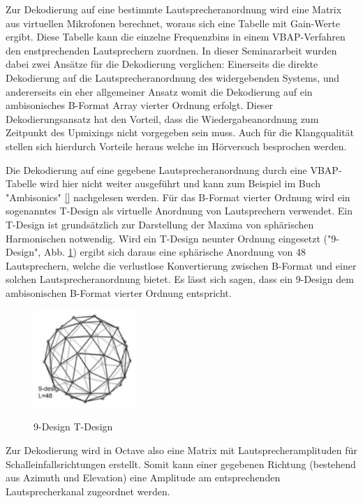 Zur Dekodierung auf eine bestimmte Lautsprecheranordnung wird eine Matrix aus virtuellen Mikrofonen berechnet, woraus sich eine Tabelle mit Gain-Werte ergibt. Diese Tabelle kann die einzelne Frequenzbins in einem VBAP-Verfahren den enstprechenden Lautsprechern zuordnen. In dieser Seminararbeit wurden dabei zwei Ansätze für die Dekodierung verglichen: Einerseits die direkte Dekodierung auf die Lautsprecheranordnung des widergebenden Systems, und andererseits ein eher allgemeiner Ansatz womit die Dekodierung auf ein ambisonisches B-Format Array vierter Ordnung erfolgt. Dieser Dekodierungsansatz hat den Vorteil, dass die Wiedergabeanordnung zum Zeitpunkt des Upmixings nicht vorgegeben sein muss. Auch für die Klangqualität stellen sich hierdurch Vorteile heraus welche im Hörversuch besprochen werden.

Die Dekodierung auf eine gegebene Lautsprecheranordnung durch eine VBAP-Tabelle wird hier nicht weiter ausgeführt und kann zum Beispiel im Buch "Ambisonics" \ref{} nachgelesen werden. Für das B-Format vierter Ordnung wird ein sogenanntes T-Design als virtuelle Anordnung von Lautsprechern verwendet. Ein T-Design ist grundsätzlich zur Darstellung der Maxima von sphärischen Harmonischen notwendig. Wird ein T-Design neunter Ordnung eingesetzt ("9-Design", Abb. \ref{fig:tdesign}) ergibt sich daraus eine sphärische Anordnung von 48 Lautsprechern, welche die verlustlose Konvertierung zwischen B-Format und einer solchen Lautsprecheranordnung bietet. Es lässt sich sagen, dass ein 9-Design dem ambisonischen B-Format vierter Ordnung entspricht.

\begin{figure}[!ht]
  \centering
  \includegraphics[width=0.35\textwidth]{implementierung/plots/t-design.png}
  \label{fig:tdesign}
  \caption{9-Design T-Design\protect\footnotemark}
\end{figure}


Zur Dekodierung wird in Octave also eine Matrix mit Lautsprecheramplituden für Schalleinfallsrichtungen erstellt. Somit kann einer gegebenen Richtung (bestehend aus Azimuth und Elevation) eine Amplitude am entsprechenden Lautsprecherkanal zugeordnet werden.

